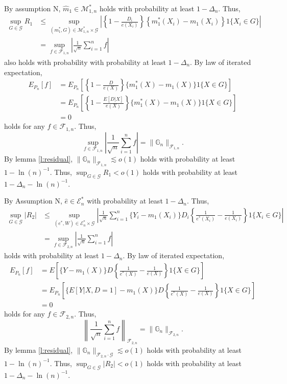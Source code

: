 \documentclass[12pt,oneside,reqno,english]{amsart}
\theoremstyle{definition}
\begin{document}
By assumption N, $\hat{m}_{1}\in \mathcal{M}^{*}_{1,n}$ holds with probability at least $1-\Delta_{n}$. Thus, 
\begin{align*}
\sup_{G\in \mathcal{G}}R_{1}&\leq 
\sup_{(m_{1}^{*},G)\in  \mathcal{M}^{*}_{1,n}\times \mathcal{G}}\left|\left\{1-\frac{D_{i}}{e(X_{i})}\right\}\left\{m^{*}_{1}(X_{i})-m_{1}(X_{i})\right\}1\{X_{i}\in G\}\right|\\
&=\sup_{f\in \mathcal{F}_{1,n}}\left|\frac{1}{\sqrt{n}}\sum_{i=1}^{n}f\right|
\end{align*}
also holds with probability with probability at least $1-\Delta_{n}$. 
By law of iterated expectation,
\begin{align*}
E_{P_{n}}[f]&=E_{P_{n}}\left[\left\{1-\frac{D}{e(X)}\right\}\{m_{1}^{*}(X)-m_{1}(X)\}1\{X\in G\}\right]\\
&=E_{P_{n}}\left[\left\{1-\frac{E\left[D|X\right]}{e(X)} \right\}\{m_{1}^{*}(X)-m_{1}(X)\}1\{X\in G\}\right]\\
&=0
\end{align*}
holds for any $f\in \mathcal{F}_{1,n}$.  
Thus, 
\[\sup_{f\in \mathcal{F}_{1,n}}\left|\frac{1}{\sqrt{n}}\sum_{i=1}^{n}f\right|=\|\mathbb{G}_{n}\|_{\mathcal{F}_{1,n}}.\]
By lemma \ref{l:residual}, $\|\mathbb{G}_{n}\|_{\mathcal{F}_{1,n}}\lesssim o(1)$
holds with probability at least $1-\ln(n)^{-1}$. Thus, 
$\sup_{G\in \mathcal{G}}R_{1}<o(1)$ holds with probability at least $1-\Delta_{n}-\ln(n)^{-1}$. 


By Assumption N, 
$\hat{e}\in \mathcal{E}^{*}_{n}$
with probability at least $1-\Delta_{n}$. Thus,  
\begin{align*}
\sup_{G\in\mathcal{G}}|R_{2}| &\leq \sup_{(e^{*},W)\in \mathcal{E}^{*}_{n}\times \mathcal{G}}\left|\frac{1}{\sqrt{n}}\sum_{i=1}^{n}\{Y_{i}-m_{1}(X_{i})\}D_{i}\left\{\frac{1}{e^{*}(X_{i})}-\frac{1}{e(X_{i})}\right\}1\{X_{i}\in G\}\right|\\
&=\sup_{f\in\mathcal{F}_{2,n}}\left|\frac{1}{\sqrt{n}}\sum_{i=1}^{n}f\right|
\end{align*}
holds with probability at least $1-\Delta_{n}$. By law of iterated expectation,  
\begin{align*}
E_{P_{n}}[f]&=E\left[\{Y-m_{1}(X)\}D\left\{\frac{1}{e^{*}(X)}-\frac{1}{e(X)}\right\}1\{X\in G\}\right]\\
&=E_{P_{n}}\left[\{E[Y|X,D=1]-m_{1}(X)\}D\left\{\frac{1}{e^{*}(X)}-\frac{1}{e(X)}\right\}1\{X\in G\}\right]\\
&=0
\end{align*}
holds for any $f\in \mathcal{F}_{2,n}$. Thus, 
\[\left\|\frac{1}{\sqrt{n}}\sum_{i=1}^{n}f\right\|_{\mathcal{F}_{2,n}}=\|\mathbb{G}_{n}\|_{\mathcal{F}_{2,n}}.\]
By lemma \ref{l:residual}, 
$\|\mathbb{G}_{n}\|_{\mathcal{F}_{2,n}\cdot \mathcal{G}}\lesssim o(1)$
holds with probability at least $1-\ln(n)^{-1}$. 
Thus, $\sup_{G\in \mathcal{G}}|R_{2}|<o(1)$ holds with probability at least $1-\Delta_{n}-\ln(n)^{-1}$. 
\end{document}
